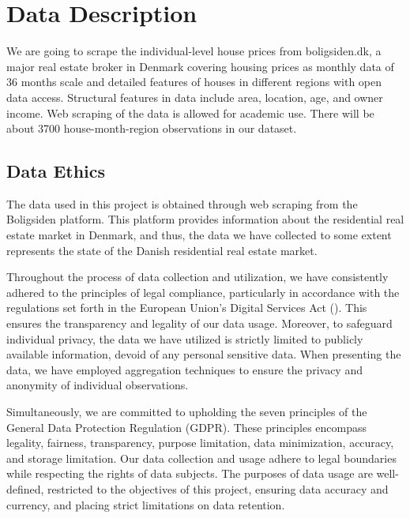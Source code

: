 \documentclass[12pt]{article} %
\begin{document}
{		

\section{Data Description}
    We are going to scrape the individual-level house prices from boligsiden.dk, a major real estate broker in Denmark covering housing prices as monthly data of 36 months scale and detailed features of houses in different regions with open data access. Structural features in data include area, location, age, and owner income. Web scraping of the data is allowed for academic use. There will be about 3700 house-month-region observations in our dataset. \par
    
    \subsection{Data Ethics}

        The data used in this project is obtained through web scraping from the Boligsiden platform. This platform provides information about the residential real estate market in Denmark, and thus, the data we have collected to some extent represents the state of the Danish residential real estate market.

        Throughout the process of data collection and utilization, we have consistently adhered to the principles of legal compliance, particularly in accordance with the regulations set forth in the European Union's Digital Services Act (\cite{DecisionServicesAct2022}). This ensures the transparency and legality of our data usage. Moreover, to safeguard individual privacy, the data we have utilized is strictly limited to publicly available information, devoid of any personal sensitive data. When presenting the data, we have employed aggregation techniques to ensure the privacy and anonymity of individual observations.

        Simultaneously, we are committed to upholding the seven principles of the General Data Protection Regulation (GDPR). These principles encompass legality, fairness, transparency, purpose limitation, data minimization, accuracy, and storage limitation. Our data collection and usage adhere to legal boundaries while respecting the rights of data subjects. The purposes of data usage are well-defined, restricted to the objectives of this project, ensuring data accuracy and currency, and placing strict limitations on data retention.

}
\end{document}
